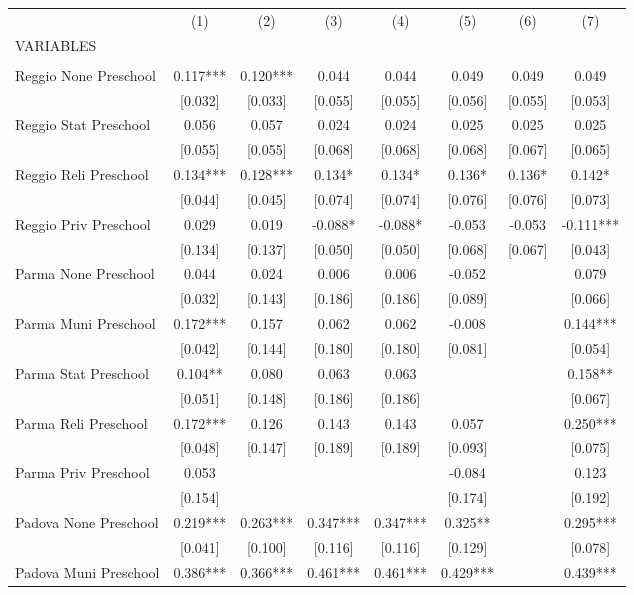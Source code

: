 \begin{tabular}{lccccccc} \hline
 & (1) & (2) & (3) & (4) & (5) & (6) & (7) \\
VARIABLES &  &  &  &  &  &  &  \\ \hline
 &  &  &  &  &  &  &  \\
Reggio None Preschool & 0.117*** & 0.120*** & 0.044 & 0.044 & 0.049 & 0.049 & 0.049 \\
 & [0.032] & [0.033] & [0.055] & [0.055] & [0.056] & [0.055] & [0.053] \\
Reggio Stat Preschool & 0.056 & 0.057 & 0.024 & 0.024 & 0.025 & 0.025 & 0.025 \\
 & [0.055] & [0.055] & [0.068] & [0.068] & [0.068] & [0.067] & [0.065] \\
Reggio Reli Preschool & 0.134*** & 0.128*** & 0.134* & 0.134* & 0.136* & 0.136* & 0.142* \\
 & [0.044] & [0.045] & [0.074] & [0.074] & [0.076] & [0.076] & [0.073] \\
Reggio Priv Preschool & 0.029 & 0.019 & -0.088* & -0.088* & -0.053 & -0.053 & -0.111*** \\
 & [0.134] & [0.137] & [0.050] & [0.050] & [0.068] & [0.067] & [0.043] \\
Parma None Preschool & 0.044 & 0.024 & 0.006 & 0.006 & -0.052 &  & 0.079 \\
 & [0.032] & [0.143] & [0.186] & [0.186] & [0.089] &  & [0.066] \\
Parma Muni Preschool & 0.172*** & 0.157 & 0.062 & 0.062 & -0.008 &  & 0.144*** \\
 & [0.042] & [0.144] & [0.180] & [0.180] & [0.081] &  & [0.054] \\
Parma Stat Preschool & 0.104** & 0.080 & 0.063 & 0.063 &  &  & 0.158** \\
 & [0.051] & [0.148] & [0.186] & [0.186] &  &  & [0.067] \\
Parma Reli Preschool & 0.172*** & 0.126 & 0.143 & 0.143 & 0.057 &  & 0.250*** \\
 & [0.048] & [0.147] & [0.189] & [0.189] & [0.093] &  & [0.075] \\
Parma Priv Preschool & 0.053 &  &  &  & -0.084 &  & 0.123 \\
 & [0.154] &  &  &  & [0.174] &  & [0.192] \\
Padova None Preschool & 0.219*** & 0.263*** & 0.347*** & 0.347*** & 0.325** &  & 0.295*** \\
 & [0.041] & [0.100] & [0.116] & [0.116] & [0.129] &  & [0.078] \\
Padova Muni Preschool & 0.386*** & 0.366*** & 0.461*** & 0.461*** & 0.429*** &  & 0.439*** \\

\end{tabular}
